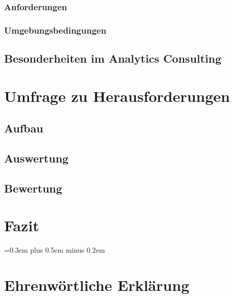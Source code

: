 \documentclass[
	12pt, %
	a4paper,
	bibliography=totoc, %
	numbers=noenddot, %
	ngerman, %
	headsepline, %
	oneside %
	]{scrbook} %
\begin{document}
\subsection{Anforderungen}\label{subsec:anforderungen}



\subsection{Umgebungsbedingungen}\label{subsec:umgebung}


\section{Besonderheiten im Analytics Consulting}\label{sec:besonderheiten}


\chapter{Umfrage zu Herausforderungen}\label{ch:umfrage}


\section{Aufbau}\label{sec:aufbau}


\section{Auswertung}\label{sec:auswertung}


\section{Bewertung}\label{sec:bewertung}



\chapter{Fazit}\label{ch:fazit}


\spaceskip=0.3em plus 0.5em minus 0.2em
\printbibliography{}


\chapter*{Ehrenwörtliche Erklärung}

\end{document}
